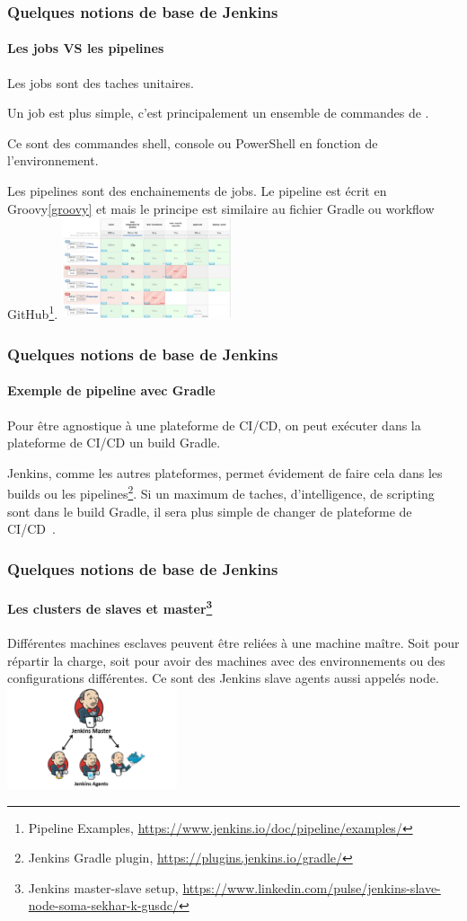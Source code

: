 \documentclass{beamer}
\begin{document}
    \begin{frame}
        \frametitle{Quelques notions de base de Jenkins}
        \framesubtitle{Les jobs VS les pipelines}
        \transdissolve
        Les jobs sont des taches unitaires.

        Un job est plus simple, c'est principalement un ensemble de commandes de .

        Ce sont des commandes shell, console ou PowerShell en fonction de l'environnement.

        \bigbreak
        Les pipelines sont des enchainements de jobs.
        Le pipeline est écrit en Groovy\cref{groovy} et mais le principe est similaire au fichier Gradle ou workflow GitHub\footnote{Pipeline Examples, \url{https://www.jenkins.io/doc/pipeline/examples/}}.
        \bigbreak
        \centering
        \includegraphics[width=5cm]{image/jenkins-pipeline.png}
    \end{frame}

    \begin{frame}
        \frametitle{Quelques notions de base de Jenkins}
        \framesubtitle{Exemple de pipeline avec Gradle}
        \transdissolve
        Pour être agnostique à une plateforme de CI/CD, on peut exécuter dans la plateforme de CI/CD un build Gradle.

        Jenkins, comme les autres plateformes, permet évidement de faire cela dans les builds ou les pipelines\footnote{Jenkins Gradle plugin, \url{https://plugins.jenkins.io/gradle/}}.
        \bigbreak
        Si un maximum de taches, d'intelligence, de scripting sont dans le build Gradle, il sera plus simple de changer de plateforme de CI/CD~.
    \end{frame}

    \begin{frame}
        \frametitle{Quelques notions de base de Jenkins}
        \framesubtitle{Les clusters de slaves et master\footnote{Jenkins master-slave setup, \url{https://www.linkedin.com/pulse/jenkins-slave-node-soma-sekhar-k-gusdc/}}}
        \transdissolve
        Différentes machines esclaves peuvent être reliées à une machine maître.
        Soit pour répartir la charge, soit pour avoir des machines avec des environnements ou des configurations différentes.
        Ce sont des Jenkins slave agents aussi appelés node.
        \bigbreak
        \centering
        \includegraphics[width=5cm]{image/jenkins-cluster.png}
    \end{frame}
\end{document}

